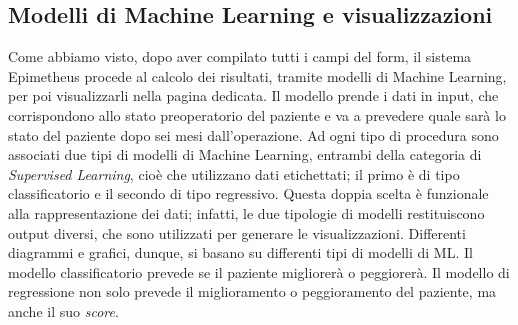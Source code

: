 \subsection{Modelli di Machine Learning e visualizzazioni}
\label{subsec:modelliML}
Come abbiamo visto, dopo aver compilato tutti i campi del form, il sistema Epimetheus procede al calcolo dei risultati, tramite modelli di Machine Learning, per poi visualizzarli nella pagina dedicata.
\newline
Il modello prende i dati in input, che corrispondono allo stato preoperatorio del paziente e va a prevedere quale sarà lo stato del paziente dopo sei mesi dall'operazione. 
\newline
Ad ogni tipo di procedura sono associati due tipi di modelli di Machine Learning, entrambi della categoria di \textit{Supervised Learning}, cioè che utilizzano dati etichettati; il primo è di tipo classificatorio e il secondo di tipo regressivo. Questa doppia scelta è funzionale alla rappresentazione dei dati; infatti, le due tipologie di modelli restituiscono output diversi, che sono utilizzati per generare le visualizzazioni. Differenti diagrammi e grafici, dunque, si basano su differenti tipi di modelli di ML.
\newline
Il modello classificatorio prevede se il paziente migliorerà o peggiorerà. Il modello di regressione non solo prevede il miglioramento o peggioramento del paziente, ma anche il suo \textit{score}.

